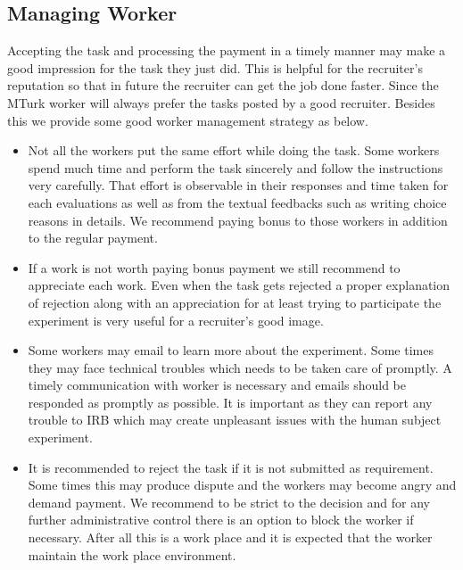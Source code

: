 \documentclass[11pt]{article}
\begin{document}

\subsection{Managing Worker} Accepting the task and processing the payment in a timely manner may make a good impression for the task they just did. This is helpful for the recruiter's reputation so that in future the recruiter can get the job done faster. Since the MTurk worker will always  prefer the tasks posted by a good recruiter. Besides this we provide some good worker management strategy as below.

\begin{itemize}

\item Not all the workers put the same effort while doing the task. Some workers spend much time and perform the task sincerely and follow the instructions very carefully. That effort is observable in their responses and time taken for each evaluations as well as from the textual feedbacks such as writing choice reasons in details. We recommend paying bonus to those workers in addition to the regular payment. 

\item If a work is not worth paying bonus payment we still recommend to appreciate each work. Even when the task gets rejected a proper explanation of rejection along with an appreciation for at least trying to participate the experiment is very useful for a recruiter's good image. 

\item Some workers may email to learn more about the experiment. Some times they may face technical troubles which needs to be taken care of promptly. A timely communication with worker is necessary and emails should be responded as  promptly as possible. It is important as they can report any trouble to IRB which may create unpleasant issues with the human subject experiment.

\item It is recommended to reject the task if it is not submitted as requirement. Some times this may produce dispute and the workers may become angry and demand payment. We recommend to be strict to the decision and for any further administrative control there is an option to block the worker if necessary. After all this is a work place and it is expected that the worker maintain the work place environment.

 \end{itemize}
\end{document}
